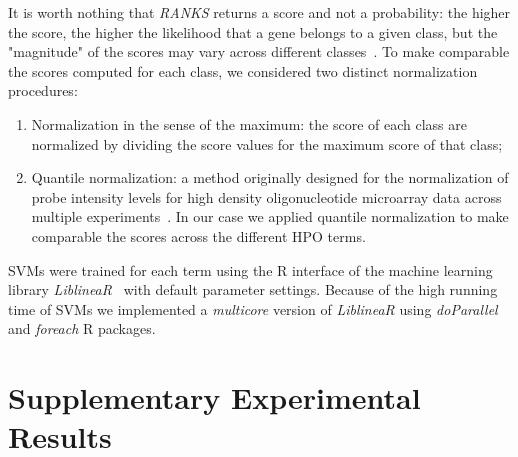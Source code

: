 \documentclass{bioinfo}
\begin{document}
It is worth nothing that {\em RANKS} returns a score and not a probability: the higher the score, the higher the likelihood that a gene belongs to a given class, but the "magnitude" of the scores may vary across different classes~\citep{Vale12c}. 
To make comparable the scores computed for each class, we considered two distinct normalization procedures:
	\begin{enumerate}
		\item Normalization in the sense of the maximum: the score of each class are normalized by dividing the score values for the maximum score of that class; 
		\item Quantile normalization: a method originally designed for the normalization of probe intensity levels for high density oligonucleotide microarray data across multiple experiments~\citep{Qnorm}. In our case we applied quantile normalization to make comparable the scores across the different HPO terms.
	\end{enumerate}

SVMs were trained for each term using the R interface of the machine learning library {\it LiblineaR}~\citep{liblinear} with default parameter settings. Because of the high running time of SVMs we implemented a {\it multicore} version of {\it LiblineaR} using {\it doParallel} and {\it foreach} R packages. 



\section{Supplementary Experimental Results}
\end{document}
